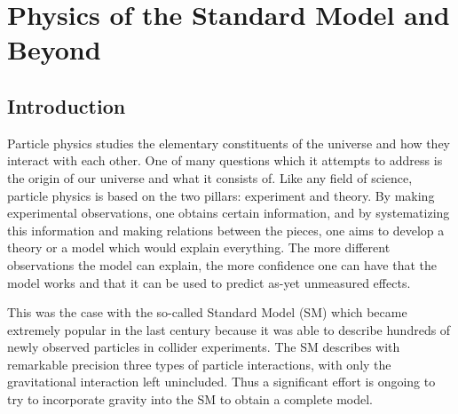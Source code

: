 \chapter{Physics of the Standard Model and Beyond}
\label{chap:Theory}



\section{Introduction}
Particle physics studies the elementary constituents of the universe and how they interact with each other. One of many questions which it attempts to address is the origin of our universe and what it consists of. 
Like any field of science, particle physics is based on the two pillars: experiment and theory.
By making experimental observations, one obtains certain information, and by systematizing this information and making relations between the pieces, one aims to develop a theory or a model which would explain everything.
The more different observations the model can explain, the more confidence one can have that the model works and that it can be used to predict as-yet unmeasured effects. 

This was the case with the so-called Standard Model (SM) which became extremely popular in the last century because it was able to describe hundreds of newly observed particles in collider experiments.
The SM describes with remarkable precision three types of particle interactions, 
with only the gravitational interaction left unincluded.
Thus a significant effort is ongoing to try to incorporate gravity into the SM to obtain a complete model.

